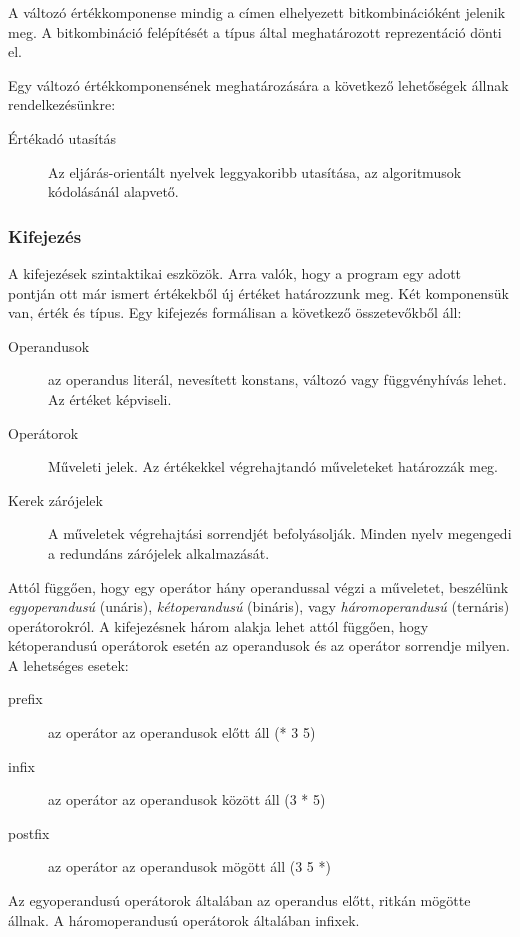 A változó értékkomponense mindig a címen elhelyezett bitkombinációként jelenik meg. A bitkombináció felépítését a típus által meghatározott reprezentáció dönti el.

Egy változó értékkomponensének meghatározására a következő lehetőségek állnak rendelkezésünkre:
\begin{description}
	\item[Értékadó utasítás] Az eljárás-orientált nyelvek leggyakoribb utasítása, az algoritmusok kódolásánál alapvető.
\end{description}

\subsubsection{Kifejezés}
A kifejezések szintaktikai eszközök. Arra valók, hogy a program egy adott pontján ott már ismert értékekből új értéket határozzunk meg. Két komponensük van, érték és típus. Egy kifejezés formálisan a következő összetevőkből áll:
\begin{description}
\item[Operandusok] az operandus literál, nevesített konstans, változó vagy függvényhívás lehet. Az értéket képviseli.
\item[Operátorok] Műveleti jelek. Az értékekkel végrehajtandó műveleteket határozzák meg.
\item[Kerek zárójelek] A műveletek végrehajtási sorrendjét befolyásolják. Minden nyelv megengedi a redundáns zárójelek alkalmazását.
\end{description}
Attól függően, hogy egy operátor hány operandussal végzi a műveletet, beszélünk \emph{egyoperandusú} (unáris), \emph{kétoperandusú} (bináris), vagy \emph{háromoperandusú} (ternáris) operátorokról. A kifejezésnek három alakja lehet attól függően, hogy kétoperandusú operátorok esetén az operandusok és az operátor sorrendje milyen. A lehetséges esetek:
\begin{description}
\item[prefix] az operátor az operandusok előtt áll (* 3 5)
\item[infix] az operátor az operandusok között áll (3 * 5)
\item[postfix] az operátor az operandusok mögött áll (3 5 *)
\end{description}
Az egyoperandusú operátorok általában az operandus előtt, ritkán mögötte állnak. A háromoperandusú operátorok általában infixek.
